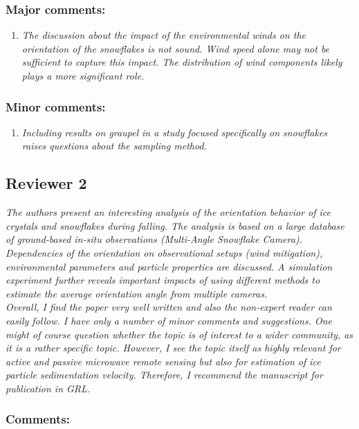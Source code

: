 \documentclass[12pt]{article}
\begin{document}
\subsubsection*{Major comments:}
\begin{enumerate}
    \item \textit{The discussion about the impact of the environmental winds on the orientation of the snowflakes is not sound. Wind speed alone may not be sufficient to capture this impact. The distribution of wind components likely plays a more significant role.}
\end{enumerate}

\subsubsection*{Minor comments:}
\begin{enumerate}
    \item \textit{Including results on graupel in a study focused specifically on snowflakes raises questions about the sampling method.}
\end{enumerate}

\clearpage
\subsection*{Reviewer 2}
\textit{The authors present an interesting analysis of the orientation behavior of ice crystals and snowflakes during falling. The analysis is based on a large database of ground-based in-situ observations (Multi-Angle Snowflake Camera). Dependencies of the orientation on observational setups (wind mitigation), environmental parameters and particle properties are discussed. A simulation experiment further reveals important impacts of using different methods to estimate the average orientation angle from multiple cameras.}\\


\textit{Overall, I find the paper very well written and also the non-expert reader can easily follow. I have only a number of minor comments and suggestions. One might of course question whether the topic is of interest to a wider community, as it is a rather specific topic. However, I see the topic itself as highly relevant for active and passive microwave remote sensing but also for estimation of ice particle sedimentation velocity. Therefore, I recommend the manuscript for publication in GRL.}

\subsubsection*{Comments:}
\end{document}
